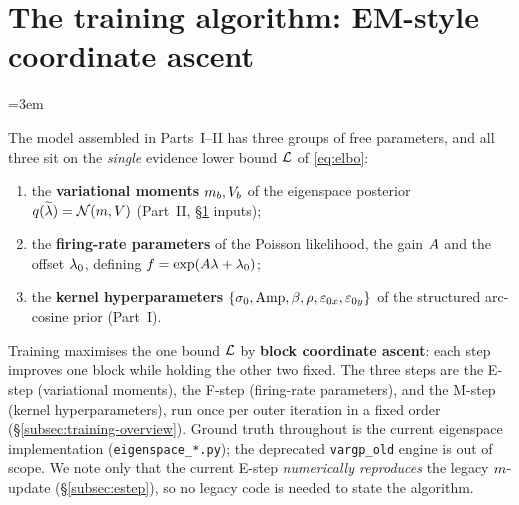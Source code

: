 
\section{The training algorithm: EM-style coordinate ascent}\label{sec:training}
\emergencystretch=3em

The model assembled in Parts~I--II has three groups of free parameters, and all
three sit on the \emph{single} evidence lower bound $\mathcal{L}$ of
\eqref{eq:elbo}:

\begin{enumerate}[label=(\alph*),leftmargin=2.2em,itemsep=1pt]
  \item the \textbf{variational moments} $m_{b},V_{b}$ of the eigenspace posterior
        $q(\widetilde{\lambda})=\mathcal{N}(m,V)$ (Part~II, \S\ref{sec:training} inputs);
  \item the \textbf{firing-rate parameters} of the Poisson likelihood, the gain
        $A$ and the offset $\lambda_{0}$, defining
        $f=\exp(A\lambda+\lambda_{0})$;
  \item the \textbf{kernel hyperparameters}
        $\{\sigma_{0},\mathrm{Amp},\beta,\rho,\varepsilon_{0x},\varepsilon_{0y}\}$ of the
        structured arc-cosine prior (Part~I).
\end{enumerate}

Training maximises the one bound $\mathcal{L}$ by \textbf{block coordinate ascent}:
each step improves one block while holding the other two fixed. The three steps
are the E-step (variational moments), the F-step (firing-rate parameters), and
the M-step (kernel hyperparameters), run once per outer iteration in a fixed
order (\S\ref{subsec:training-overview}). Ground truth throughout is the current
eigenspace implementation (\texttt{eigenspace\_*.py}); the deprecated
\texttt{vargp\_old} engine is out of scope. We note only that the current E-step
\emph{numerically reproduces} the legacy $m$-update (\S\ref{subsec:estep}), so
no legacy code is needed to state the algorithm.

